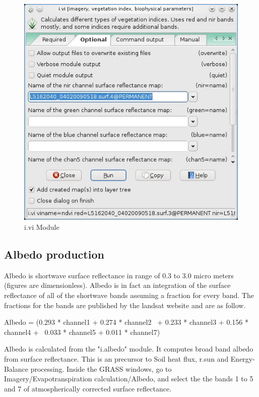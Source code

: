 \begin{figure}[htbp]
   \centering
   \includegraphics[scale=0.4]{gipe019.png}
   \caption{i.vi Module}
   \label{fig:gipe019}
\end{figure}

\subsection{Albedo production}
Albedo is shortwave surface reflectance in range of 0.3 to 3.0 micro meters (figures are dimensionless).\newline 
Albedo is in fact an integration of the surface reflectance of all of the shortwave bands assuming a fraction for every band. The fractions for the bands are published by the landsat website and are as follow.
\begin{smallverbatim}
 Albedo = (0.293 * channel1 + 0.274 * channel2 \
        + 0.233 * channel3 + 0.156 * channel4 + \
        0.033 * channel5 + 0.011 * channel7)
\end{smallverbatim}
Albedo is calculated from the "i.albedo" module. It  computes broad band albedo from surface reflectance. This is an precursor to Soil heat flux, r.sun and Energy-Balance processing.\newline
Inside the GRASS windows, go to Imagery/Evapotranspiration calculation/Albedo, and select the the bands 1 to 5 and 7 of atmospherically corrected surface reflectance.\newline

